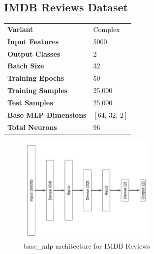 \subsection{IMDB Reviews Dataset}

\begin{tabular}{@{}ll@{}}
\textbf{Variant} & Complex \\
\textbf{Input Features} & 5000 \\
\textbf{Output Classes} & 2 \\
\textbf{Batch Size} & 32 \\
\textbf{Training Epochs} & 50 \\
\textbf{Training Samples} & 25,000 \\
\textbf{Test Samples} & 25,000 \\
\textbf{Base MLP Dimensions} & $[64,\, 32,\, 2]$ \\
\textbf{Total Neurons} & 96 \\
\end{tabular}

\begin{figure}[H]
    \centering
    \includegraphics[height=0.28\textheight,width=0.6\textwidth]{Figures/Results/IMDB/IMDB_base_mlp_architecture.png} 
    \captionsetup{justification=centering}  %
    \caption{base\_mlp architecture for IMDB Reviews}
    \label{fig:imdbMlpBaseArch}
\end{figure}

